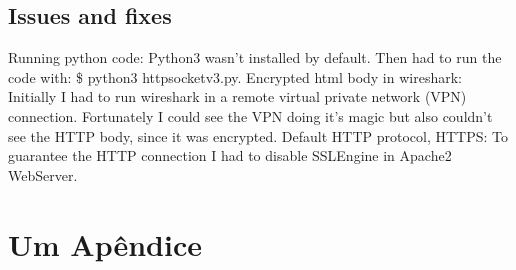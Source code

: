 \documentclass[11pt,a4paper]{report}
\begin{document}
\section{Issues and fixes}
    Running python code:
        Python3 wasn't installed by default. Then had to run the code with: \$ python3 httpsocketv3.py.
    Encrypted html body in wireshark:
        Initially I had to run wireshark in a remote virtual private network (VPN) connection. Fortunately I could see the VPN doing it's magic but also couldn't see the HTTP body, since it was encrypted.
    Default HTTP protocol, HTTPS:
        To guarantee the HTTP connection I had to disable SSLEngine in Apache2 WebServer.


\renewcommand{\bibname}{Referências bibliográficas}



\appendix
\chapter{Um Apêndice}
\end{document}
